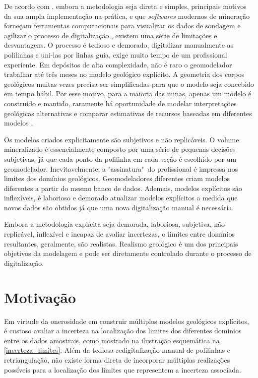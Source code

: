 De acordo com , embora a metodologia seja direta e simples, principais motivos da sua ampla implementação na prática, e que \textit{softwares} modernos de mineração forneçam ferramentas computacionais para visualizar os dados de sondagem e agilizar o processo de digitalização \cite{silvaenhancedgeomodeling}, existem uma série de limitações e desvantagens. O processo é tedioso e demorado, digitalizar manualmente as polilinhas e uni-las por linhas guia, exige muito tempo de um profissional experiente. Em depósitos de alta complexidade, não é raro o geomodelador trabalhar até três meses no modelo geológico explícito. A geometria dos corpos geológicos muitas vezes precisa ser simplificadas para que o modelo seja concebido em tempo hábil. Por esse motivo, para a maioria das minas, apenas um modelo é construído e mantido, raramente há oportunidade de modelar interpretações geológicas alternativas e comparar estimativas de recursos baseadas em diferentes modelos \cite{cowan2003practical}.

Os modelos criados explicitamente são subjetivos e não replicáveis. O volume mineralizado é essencialmente composto por uma série de pequenas decisões subjetivas, já que cada ponto da polilinha em cada seção é escolhido por um geomodelador. Inevitavelmente, a "assinatura"\ do profissional é impressa nos limites dos domínios geológicos. Geomodeladores diferentes criam modelos diferentes a partir do mesmo banco de dados. Ademais, modelos explícitos são inflexíveis, é laborioso e demorado atualizar modelos explícitos a medida que novos dados são obtidos já que uma nova digitalização manual é necessária.

Embora a metodologia explícita seja demorada, laboriosa, subjetiva, não replicável, inflexível e incapaz de avaliar incertezas, o limites entre domínios resultantes, geralmente, são realistas. Realismo geológico é um dos principais objetivos da modelagem e pode ser diretamente controlado durante o processo de digitalização.

\section{Motivação}

Em virtude da onerosidade em construir múltiplos modelos geológicos explícitos, é custoso avaliar a incerteza na localização dos limites dos diferentes domínios entre os dados amostrais, como mostrado na ilustração esquemática na \autoref{incerteza_limites}. Além da tediosa redigitalização manual de polilinhas e retriangulação, não existe forma direta de incorporar múltiplas realizações possíveis para a localização dos limites que representem a incerteza associada.


